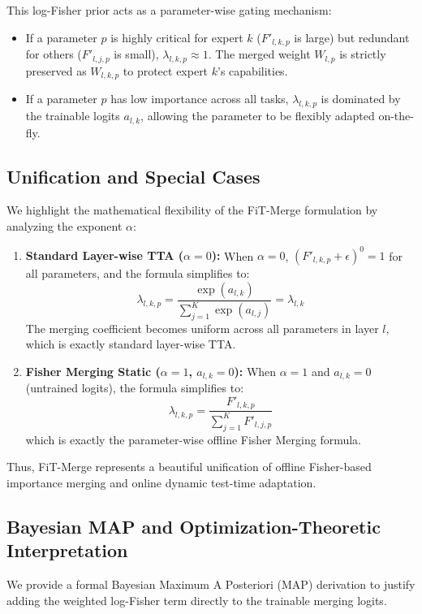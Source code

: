 \documentclass{article}
\theoremstyle{plain}
\theoremstyle{definition}
\theoremstyle{remark}
\begin{document}
This log-Fisher prior acts as a parameter-wise gating mechanism:
\begin{itemize}
  \item If a parameter $p$ is highly critical for expert $k$ ($F'_{l,k,p}$ is large) but redundant for others ($F'_{l,j,p}$ is small), $\lambda_{l,k,p} \approx 1$. The merged weight $W_{l,p}$ is strictly preserved as $W_{l,k,p}$ to protect expert $k$'s capabilities.
  \item If a parameter $p$ has low importance across all tasks, $\lambda_{l,k,p}$ is dominated by the trainable logits $a_{l,k}$, allowing the parameter to be flexibly adapted on-the-fly.
\end{itemize}

\subsection{Unification and Special Cases}
We highlight the mathematical flexibility of the FiT-Merge formulation by analyzing the exponent $\alpha$:
\begin{enumerate}
  \item \textbf{Standard Layer-wise TTA ($\alpha = 0$):} When $\alpha = 0$, $(F'_{l,k,p} + \epsilon)^0 = 1$ for all parameters, and the formula simplifies to:
  $$\lambda_{l,k,p} = \frac{\exp(a_{l,k})}{\sum_{j=1}^K \exp(a_{l,j})} = \lambda_{l,k}$$
  The merging coefficient becomes uniform across all parameters in layer $l$, which is exactly standard layer-wise TTA.
  \item \textbf{Fisher Merging Static ($\alpha = 1$, $a_{l,k} = 0$):} When $\alpha = 1$ and $a_{l,k} = 0$ (untrained logits), the formula simplifies to:
  $$\lambda_{l,k,p} = \frac{F'_{l,k,p}}{\sum_{j=1}^K F'_{l,j,p}}$$
  which is exactly the parameter-wise offline Fisher Merging formula.
\end{enumerate}
Thus, FiT-Merge represents a beautiful unification of offline Fisher-based importance merging and online dynamic test-time adaptation.

\subsection{Bayesian MAP and Optimization-Theoretic Interpretation}
We provide a formal Bayesian Maximum A Posteriori (MAP) derivation to justify adding the weighted log-Fisher term directly to the trainable merging logits.
\end{document}
